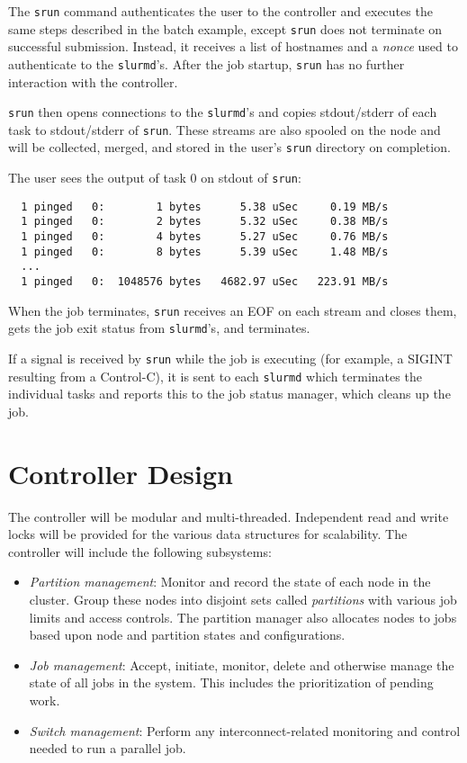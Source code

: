 The {\tt srun} command authenticates the user to the controller and 
executes the same steps described in the batch example, except {\tt srun} 
does not terminate on successful submission.  Instead, it receives a list of
hostnames and a {\em nonce} used to authenticate to the {\tt slurmd}'s.
After the job startup, {\tt srun} has no further interaction with the 
controller.

{\tt srun} then opens connections to the {\tt slurmd}'s and copies 
stdout/stderr of each task to stdout/stderr of {\tt srun}.  These streams
are also spooled on the node and will be collected, merged, and stored
in the user's {\tt srun} directory on completion.

The user sees the output of task 0 on stdout of {\tt srun}:

\begin{verbatim}
  1 pinged   0:        1 bytes      5.38 uSec     0.19 MB/s                     
  1 pinged   0:        2 bytes      5.32 uSec     0.38 MB/s                     
  1 pinged   0:        4 bytes      5.27 uSec     0.76 MB/s                     
  1 pinged   0:        8 bytes      5.39 uSec     1.48 MB/s                     
  ...
  1 pinged   0:  1048576 bytes   4682.97 uSec   223.91 MB/s              
\end{verbatim}

When the job terminates, {\tt srun} receives an EOF on each stream and
closes them, gets the job exit status from {\tt slurmd}'s, and terminates.

If a signal is received by {\tt srun} while the job is executing (for example,
a SIGINT resulting from a Control-C), it is sent to each {\tt slurmd} which 
terminates the individual tasks and reports this to the job status manager,
which cleans up the job.

\section{Controller Design}

The controller will be modular and multi-threaded. 
Independent read and write locks will be provided for the various data 
structures for scalability. 
The controller  will include the following subsystems:

\begin{itemize}
\item {\em Partition management}: Monitor and record the state of each 
node in the cluster.
Group these nodes into disjoint sets called {\em partitions} with various 
job limits and access controls.
The partition manager also allocates nodes to jobs based upon 
node and partition states and configurations. 

\item {\em Job management}: Accept, initiate, monitor, delete and otherwise 
manage the state of all jobs in the system. This includes the prioritization 
of pending work.

\item {\em Switch management}: Perform any interconnect-related 
monitoring and control needed to run a parallel job.

\end{itemize}

